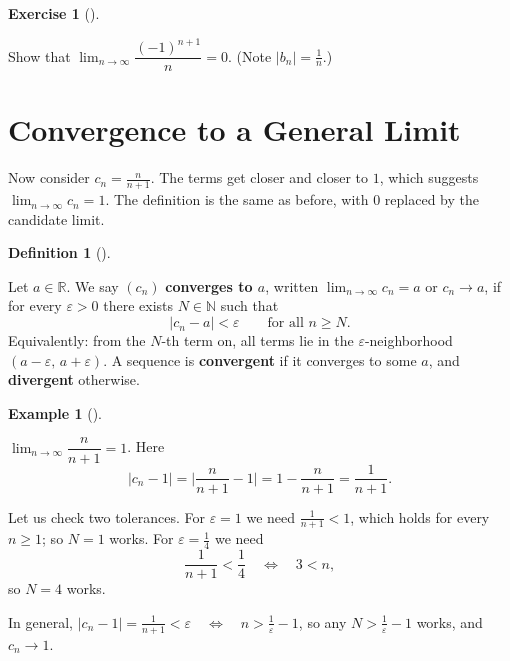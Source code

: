 \documentclass[
  letterpaper,
  DIV=11,
  numbers=noendperiod]{scrreprt}
\theoremstyle{plain}
\theoremstyle{plain}
\theoremstyle{definition}
\newtheorem{definition}{Definition}[chapter]
\theoremstyle{definition}
\newtheorem{exercise}{Exercise}[chapter]
\theoremstyle{definition}
\newtheorem{example}{Example}[chapter]
\theoremstyle{plain}
\theoremstyle{plain}
\theoremstyle{remark}
\begin{document}
\begin{exercise}[]\protect\hypertarget{exr-alternating-null}{}\label{exr-alternating-null}

Show that \(\lim_{n\to\infty} \dfrac{(-1)^{n+1}}{n} = 0\). (Note
\(\lvert b_n \rvert = \tfrac1n\).)

\end{exercise}

\section{Convergence to a General
Limit}\label{convergence-to-a-general-limit}

Now consider \(c_n = \tfrac{n}{n+1}\). The terms get closer and closer
to \(1\), which suggests \(\lim_{n\to\infty} c_n = 1\). The definition
is the same as before, with \(0\) replaced by the candidate limit.

\begin{definition}[]\protect\hypertarget{def-limit}{}\label{def-limit}

\hfill\break
Let \(a\in\mathbb{R}\). We say \((c_n)\) \textbf{converges to \(a\)},
written \(\lim_{n\to\infty} c_n = a\) or \(c_n \to a\), if for every
\(\varepsilon>0\) there exists \(N\in\mathbb{N}\) such that \[
\lvert c_n - a \rvert < \varepsilon\qquad\text{for all } n \ge N.
\] Equivalently: from the \(N\)-th term on, all terms lie in the
\(\varepsilon\)-neighborhood \((a-\varepsilon,\, a+\varepsilon)\). A
sequence is \textbf{convergent} if it converges to some \(a\), and
\textbf{divergent} otherwise.

\end{definition}

\begin{example}[]\protect\hypertarget{exm-n-over-n-plus-1}{}\label{exm-n-over-n-plus-1}

\hfill\break
\(\lim_{n\to\infty} \dfrac{n}{n+1} = 1\). Here \[
\lvert c_n - 1 \rvert = \lvert \frac{n}{n+1} - 1 \rvert = 1 - \frac{n}{n+1} = \frac{1}{n+1}.
\]

Let us check two tolerances. For \(\varepsilon= 1\) we need
\(\tfrac{1}{n+1} < 1\), which holds for every \(n\ge 1\); so \(N = 1\)
works. For \(\varepsilon= \tfrac14\) we need \[
\frac{1}{n+1} < \frac14 \quad \Leftrightarrow \quad 3 < n,
\] so \(N = 4\) works.

In general,
\(\lvert c_n - 1 \rvert = \tfrac{1}{n+1} < \varepsilon\quad \Leftrightarrow \quad n > \tfrac1\varepsilon- 1\),
so any \(N > \tfrac1\varepsilon- 1\) works, and \(c_n \to 1\).

\end{example}
\end{document}
